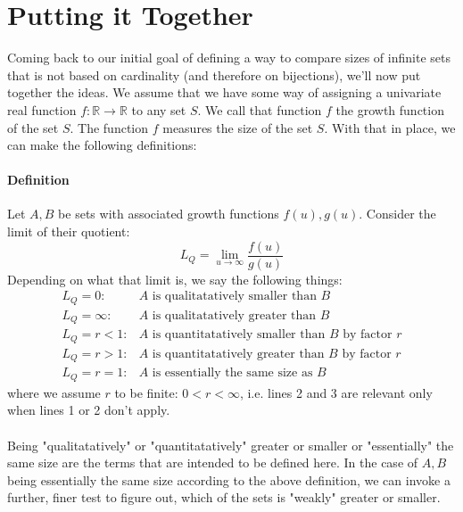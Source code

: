\documentclass[12pt]{article}
\begin{document}



\section{Putting it Together}
Coming back to our initial goal of defining a way to compare sizes of infinite sets that is not based on cardinality (and therefore on bijections), we'll now put together the ideas. We assume that we have some way of assigning a univariate real function $f: \mathbb{R} \rightarrow \mathbb{R}$ to any set $S$. We call that function $f$ the growth function of the set $S$. The function $f$ measures the size of the set $S$.  With that in place, we can make the following definitions:

\paragraph{Definition}
Let $A,B$ be sets with associated growth functions $f(u), g(u)$. Consider the limit of their quotient:
\begin{equation}
 L_Q = \lim_{u \rightarrow \infty}	\frac{f(u)}{g(u)}
\end{equation}
Depending on what that limit is, we say the following things:
\begin{eqnarray}
 L_Q = 0:         &  A \text{ is qualitatatively smaller than } B \\
 L_Q = \infty:    &  A \text{ is qualitatatively greater than } B \\
 L_Q = r < 1:     &  A \text{ is quantitatatively smaller than } B \text{ by factor } r \\
 L_Q = r > 1:     &  A \text{ is quantitatatively greater than } B \text{ by factor } r \\
 L_Q = r = 1:     &  A \text{ is essentially the same size as } B
\end{eqnarray}
where we assume $r$ to be finite: $0 < r < \infty$, i.e. lines 2 and 3 are relevant only when lines 1 or 2 don't apply.

\paragraph{}
Being "qualitatatively" or "quantitatatively" greater or smaller or "essentially" the same size are the terms that are intended to be defined here. In the case of $A,B$ being essentially the same size according to the above definition, we can invoke a further, finer test to figure out, which of the sets is "weakly" greater or smaller.
\end{document}
